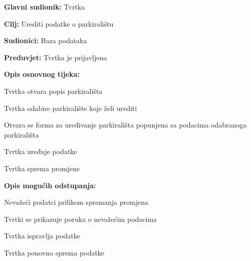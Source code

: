 \noindent {}
\begin{packed_item}
	
	\item \textbf{Glavni sudionik:} Tvrtka
	\item \textbf{Cilj:} Urediti podatke o parkiralištu
	\item \textbf{Sudionici:} Baza podataka
	\item \textbf{Preduvjet:} Tvrtka je prijavljena
	\item \textbf{Opis osnovnog tijeka:}
	
	\item[] \begin{packed_enum}
		
		\item Tvrtka otvara popis parkirališta
		\item Tvrtka odabire parkiralište koje želi urediti
		\item Otvara se forma za uređivanje parkirališta popunjena sa podacima odabranoga parkirališta
		\item Tvrtka uređuje podatke
		\item Tvrtka sprema promjene
	
	\end{packed_enum}
	
	\item  \textbf{Opis mogućih odstupanja:}
	
	\item[] \begin{packed_item}
		
		\item[6.a] Nevažeći podatci prilikom spremanja promjena
		\item[] \begin{packed_enum}
			
			\item Tvrtki se prikazuje poruka o nevažećim podacima
			\item Tvrtka ispravlja podatke
			\item Tvrtka ponovno sprema podatke
			
		\end{packed_enum}
		
	\end{packed_item}

\end{packed_item}

